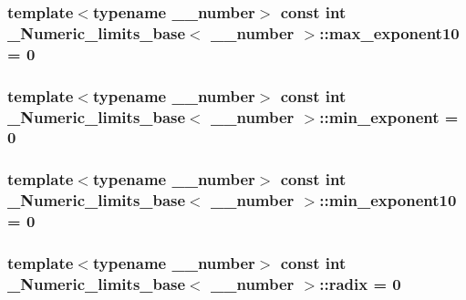 \subsubsection[{max\+\_\+exponent10}]{\setlength{\rightskip}{0pt plus 5cm}template$<$typename \+\_\+\+\_\+number$>$ const int {\bf \+\_\+\+Numeric\+\_\+limits\+\_\+base}$<$ \+\_\+\+\_\+number $>$\+::max\+\_\+exponent10 = 0\hspace{0.3cm}{\ttfamily [static]}}\label{class__Numeric__limits__base_a76cf75d2e3becdc0f2e1db245ca408fb}
\hypertarget{class__Numeric__limits__base_a33abfbbaf02a0ea0080f687bec916dc3}{}
\subsubsection[{min\+\_\+exponent}]{\setlength{\rightskip}{0pt plus 5cm}template$<$typename \+\_\+\+\_\+number$>$ const int {\bf \+\_\+\+Numeric\+\_\+limits\+\_\+base}$<$ \+\_\+\+\_\+number $>$\+::min\+\_\+exponent = 0\hspace{0.3cm}{\ttfamily [static]}}\label{class__Numeric__limits__base_a33abfbbaf02a0ea0080f687bec916dc3}
\hypertarget{class__Numeric__limits__base_a16a17ce6c19c5c4c811bd226a8a66a7d}{}
\subsubsection[{min\+\_\+exponent10}]{\setlength{\rightskip}{0pt plus 5cm}template$<$typename \+\_\+\+\_\+number$>$ const int {\bf \+\_\+\+Numeric\+\_\+limits\+\_\+base}$<$ \+\_\+\+\_\+number $>$\+::min\+\_\+exponent10 = 0\hspace{0.3cm}{\ttfamily [static]}}\label{class__Numeric__limits__base_a16a17ce6c19c5c4c811bd226a8a66a7d}
\hypertarget{class__Numeric__limits__base_ae0a3d6a224b58fe3a32cdfbbb3498896}{}
\subsubsection[{radix}]{\setlength{\rightskip}{0pt plus 5cm}template$<$typename \+\_\+\+\_\+number$>$ const int {\bf \+\_\+\+Numeric\+\_\+limits\+\_\+base}$<$ \+\_\+\+\_\+number $>$\+::radix = 0\hspace{0.3cm}{\ttfamily [static]}}\label{class__Numeric__limits__base_ae0a3d6a224b58fe3a32cdfbbb3498896}
\hypertarget{class__Numeric__limits__base_a1fcd74812fb460513c9ec0d0fae0f41b}{}
